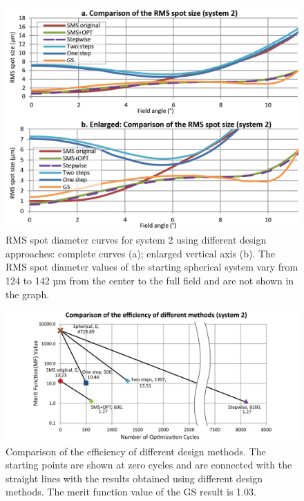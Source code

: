 \begin{figure}[h!]
    \centering
    \includegraphics[width=1\textwidth]{chapter-5/figures/Fig10_case2_rms.png}
    \caption{RMS spot diameter curves for system 2 using different design approaches: complete curves (a); enlarged vertical axis (b). The RMS spot diameter values of the starting spherical system vary from 124 to 142 µm from the center to the full field and are not shown in the graph.}
    \label{fig: fig10_case2_rmsCurvecompare}
\end{figure}

\begin{figure}[h!]
    \centering
    \includegraphics[width=1\textwidth]{chapter-5/figures/Figure11_OE340147.png}
    \caption{Comparison of the efficiency of different design methods. The starting points are shown at zero cycles and are connected with the straight lines with the results obtained using different design methods. The merit function value of the GS result is 1.03.}
    \label{fig: fig11_case2_efficiencyCompare}
\end{figure}
\newpage
